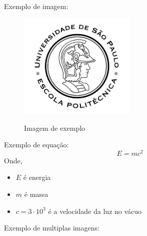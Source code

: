 Exemplo de imagem:
\begin{figure}[h!]
    \centering
    \caption{Imagem de exemplo}
    \includegraphics[width=0.5\textwidth]{imagens/Poli.png}
    \label{fig:poli}
\end{figure}
Exemplo de equação:
\begin{equation}
    E = mc^2
    \label{eq:relatividade}
\end{equation}
Onde, \begin{itemize}
    \item $E$ é energia
    \item $m$ é massa
    \item $c=3\cdot10^3$ é a velocidade da luz no vácuo
\end{itemize}
\newpage Exemplo de multiplas imagens:
